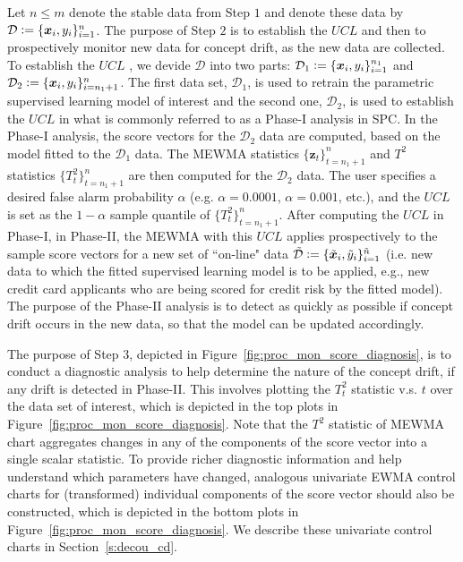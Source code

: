 \documentclass[twoside,11pt]{article}
\begin{document}
Let $n\leq m$ denote the stable data from Step $1$ and denote these data by $\mathcal{D} \vcentcolon=\{\bm {x}_i, y_i\} _{i=1} ^{n}$. The purpose of Step $2$ is to establish the $UCL$  and then to prospectively monitor new data for concept drift, as the new data are collected. To establish the $UCL$ , we devide $\mathcal{D}$ into two parts: $ \mathcal{D}_1 \vcentcolon= \{\bm {x}_i, y_i\} _{i=1} ^{n_1}$ and $\mathcal{D}_2 \vcentcolon= \{\bm {x}_i, y_i\} _{i=n_1+1} ^{n}$. The first data set, $\mathcal{D}_1$, is used to retrain the parametric supervised learning model of interest and the second one, $\mathcal{D}_2$, is used to establish the $UCL$  in what is commonly referred to as a Phase-I analysis in SPC. In the Phase-I analysis, the score vectors for the $\mathcal{D}_2$ data are computed, based on the model fitted to the $\mathcal{D}_1$ data. The MEWMA statistics $\{\bm{z}_t\}_{t=n_1+1}^n$ and $T^2$ statistics $\{T_t^2\}_{t=n_1+1}^n$ are then computed for the $\mathcal{D}_2$ data. The user specifies a desired false alarm probability $\alpha$ (e.g. $\alpha=0.0001$, $\alpha=0.001$, etc.), and the $UCL$  is set as the $1-\alpha$ sample quantile of $\{T_t^2\}_{t=n_1+1}^n$. After computing the $UCL$  in Phase-I, in Phase-II, the MEWMA with this $UCL$  applies prospectively to the sample score vectors for a new set of ``on-line" data $\tilde{\mathcal{D}}\vcentcolon=\{\tilde{\bm{x}}_i,\tilde{y}_i\}_{i = 1}^{\tilde{n}}$ (i.e. new data to which the fitted supervised learning model is to be applied, e.g., new credit card applicants who are being scored for credit risk by the fitted model). The purpose of the Phase-II analysis is to detect as quickly as possible if concept drift occurs in the new data, so that the model can be updated accordingly. 

The purpose of Step $3$, depicted in Figure~\ref{fig:proc_mon_score_diagnosis}, is to conduct a diagnostic analysis to help determine the nature of the concept drift, if any drift is detected in Phase-II. This involves plotting the $T_t^2$ statistic v.s. $t$ over the data set of interest, which is depicted in the top plots in Figure~\ref{fig:proc_mon_score_diagnosis}. Note that the $T^2$ statistic of MEWMA chart aggregates changes in any of the components of the score vector into a single scalar statistic. To provide richer diagnostic information and help understand which parameters have changed, analogous univariate EWMA control charts for (transformed) individual components of the score vector should also be constructed, which is depicted in the bottom plots in Figure~\ref{fig:proc_mon_score_diagnosis}. We describe these univariate control charts in Section~\ref{s:decou_cd}.
\end{document}
